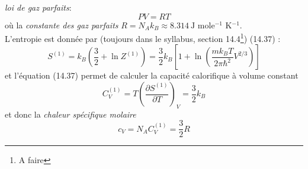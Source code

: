 \documentclass	[11pt, a4paper, openany]{book}
\begin{document}
		\textit{loi de gaz parfaits}:
		\begin{equation}
			PV = RT
		\end{equation}
		où la \textit{constante des gaz parfaits} $R = N_Ak_B \approx 8.314\ \text{J mole$^{-1}$ K$^{-1}$}$.\\
		L'entropie est donnée par (toujours dans le syllabus, section 14.4\footnote{A faire}) (14.37) :
		\begin{equation}
			S^{(1)} = k_B(\frac{3}{2}+\ln Z^{(1)}) = \frac{3}{2}k_B\left[1+\ln\left(\dfrac{mk_BT}{2\pi\hbar^2}V^{
				2/3}\right)\right]
		\end{equation}
		et l'équation (14.37) permet de calculer la capacité calorifique à volume constant 
		\begin{equation}
			C_V^{(1)} = T\left(\frac{\partial S^{(1)}}{\partial T}\right)_V = \frac{3}{2}k_B
		\end{equation}
		et donc la \textit{chaleur spécifique molaire}
		\begin{equation}
			c_V = N_AC_V^ {(1)} = \frac{3}{2}R
		\end{equation}
		
		
		
\end{document}
